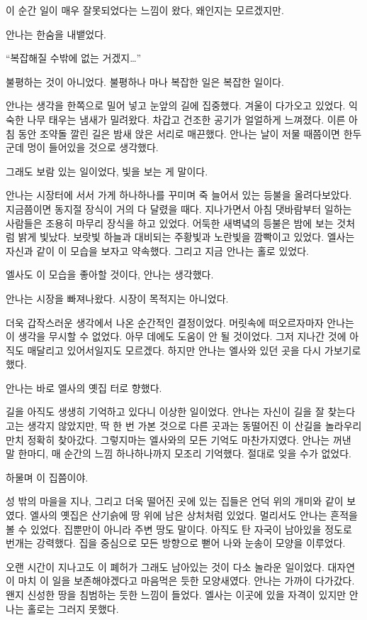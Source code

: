 이 순간 일이 매우 잘못되었다는 느낌이 왔다, 왜인지는 모르겠지만.

안나는 한숨을 내뱉었다.

``복잡해질 수밖에 없는 거겠지\ldots''

불평하는 것이 아니었다. 불평하나 마나 복잡한 일은 복잡한 일이다.

안나는 생각을 한쪽으로 밀어 넣고 눈앞의 길에 집중했다. 겨울이 다가오고 있었다. 익숙한 나무 태우는 냄새가 밀려왔다. 차갑고 건조한 공기가 얼얼하게 느껴졌다. 이른 아침 동안 조약돌 깔린 길은 밤새 앉은 서리로 매끈했다. 안나는 날이 저물 때쯤이면 한두 군데 멍이 들어있을 것으로 생각했다.

그래도 보람 있는 일이었다, 빛을 보는 게 말이다.

안나는 시장터에 서서 가게 하나하나를 꾸미며 죽 늘어서 있는 등불을 올려다보았다. 지금쯤이면 동지절 장식이 거의 다 달렸을 때다. 지나가면서 아침 댓바람부터 일하는 사람들은 조용히 마무리 장식을 하고 있었다. 어둑한 새벽녘의 등불은 밤에 보는 것처럼 밝게 빛났다. 보랏빛 하늘과 대비되는 주황빛과 노란빛을 깜빡이고 있었다. 엘사는 자신과 같이 이 모습을 보자고 약속했다. 그리고 지금 안나는 홀로 있었다.

엘사도 이 모습을 좋아할 것이다, 안나는 생각했다.

안나는 시장을 빠져나왔다. 시장이 목적지는 아니었다.

더욱 갑작스러운 생각에서 나온 순간적인 결정이었다. 머릿속에 떠오르자마자 안나는 이 생각을 무시할 수 없었다. 아무 데에도 도움이 안 될 것이었다. 그저 지나간 것에 아직도 매달리고 있어서일지도 모르겠다. 하지만 안나는 엘사와 있던 곳을 다시 가보기로 했다.

안나는 바로 엘사의 옛집 터로 향했다.

길을 아직도 생생히 기억하고 있다니 이상한 일이었다. 안나는 자신이 길을 잘 찾는다고는 생각지 않았지만, 딱 한 번 가본 것으로 다른 곳과는 동떨어진 이 산길을 놀라우리만치 정확히 찾아갔다. 그렇지마는 엘사와의 모든 기억도 마찬가지였다. 안나는 꺼낸 말 한마디, 매 순간의 느낌 하나하나까지 모조리 기억했다. 절대로 잊을 수가 없었다.

하물며 이 집쯤이야.

성 밖의 마을을 지나, 그리고 더욱 떨어진 곳에 있는 집들은 언덕 위의 개미와 같이 보였다. 엘사의 옛집은 산기슭에 땅 위에 남은 상처처럼 있었다. 멀리서도 안나는 흔적을 볼 수 있었다. 집뿐만이 아니라 주변 땅도 말이다. 아직도 탄 자국이 남아있을 정도로 번개는 강력했다. 집을 중심으로 모든 방향으로 뻗어 나와 눈송이 모양을 이루었다.

오랜 시간이 지나고도 이 폐허가 그래도 남아있는 것이 다소 놀라운 일이었다. 대자연이 마치 이 일을 보존해야겠다고 마음먹은 듯한 모양새였다. 안나는 가까이 다가갔다. 왠지 신성한 땅을 침범하는 듯한 느낌이 들었다. 엘사는 이곳에 있을 자격이 있지만 안나는 홀로는 그러지 못했다.

